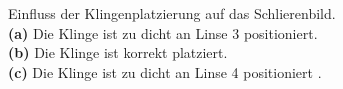 \begin{figure}[h]
	\centering
	\caption[Einfluss der Platzierung der Klinge im Schlierenverfahren]{
		Einfluss der Klingenplatzierung auf das Schlierenbild.\\
		\textbf{(a)} Die Klinge ist zu dicht an Linse 3 positioniert.\\
		\textbf{(b)} Die Klinge ist korrekt platziert.\\
		\textbf{(c)} Die Klinge ist zu dicht an Linse 4 positioniert \cite[Fig.~2.2]{panigrahi_schlieren_2012}.
	}
	\label{fig:schlieren_knife}
\end{figure}



